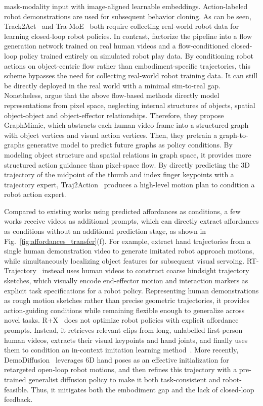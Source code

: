 \documentclass[Afour,sageh,times]{sagej}
\begin{document}
mask-modality input with image-aligned learnable embeddings. Action-labeled robot demonstrations are used for subsequent behavior cloning. As can be seen, Track2Act~\citep{bharadhwaj2024track2act} and Tra-MoE~\citep{yang2025tra} both require collecting real-world robot data for learning closed-loop robot policies. In contrast, \cite{xu2024flow} factorize the pipeline into a flow generation network trained on real human videos and a flow-conditioned closed-loop policy trained entirely on simulated robot play data. By conditioning robot actions on object-centric flow rather than embodiment-specific trajectories, this scheme bypasses the need for collecting real-world robot training data. It can still be directly deployed in the real world with a minimal sim-to-real gap. Nonetheless, \cite{chen2025graphmimic} argue that the above flow-based methods directly model representations from pixel space, neglecting internal structures of objects, spatial object-object and object-effector relationships. Therefore, they propose GraphMimic, which abstracts each human video frame into a structured graph with object vertices and visual action vertices. Then, they pretrain a graph-to-graphs generative model to predict future graphs as policy conditions. By modeling object structure and spatial relations in graph space, it provides more structured action guidance than pixel-space flow. By directly predicting the 3D trajectory of the midpoint of the thumb and index finger keypoints with a trajectory expert, Traj2Action~\citep{zhou2025human} produces a high-level motion plan to condition a robot action expert. 

Compared to existing works using predicted affordances as conditions, a few works receive videos as additional prompts, which can directly extract affordances as conditions without an additional prediction stage, as shown in Fig.~\ref{fig:affordances_transfer}(f). For example, \cite{wang2023robot} extract hand trajectories from a single human demonstration video to generate imitated robot approach motions, while simultaneously localizing object features for subsequent visual servoing. RT-Trajectory~\citep{gu2023rt} instead uses human videos to construct coarse hindsight trajectory sketches, which visually encode end-effector motion and interaction markers as explicit task specifications for a robot policy. Representing human demonstrations as rough motion sketches rather than precise geometric trajectories, it provides action-guiding conditions while remaining flexible enough to generalize across novel tasks. R+X~\citep{papagiannis2025r} does not optimize robot policies with explicit affordance prompts. Instead, it retrieves relevant clips from long, unlabelled first-person human videos, extracts their visual keypoints and hand joints, and finally uses them to condition an in-context imitation learning method~\citep{di2024keypoint}. More recently, DemoDiffusion~\citep{park2025demodiffusion} leverages 6D hand poses as an effective initialization for retargeted open-loop robot motions, and then refines this trajectory with a pre-trained generalist diffusion policy to make it both task-consistent and robot-feasible. Thus, it mitigates both the embodiment gap and the lack of closed-loop feedback. 
\end{document}
